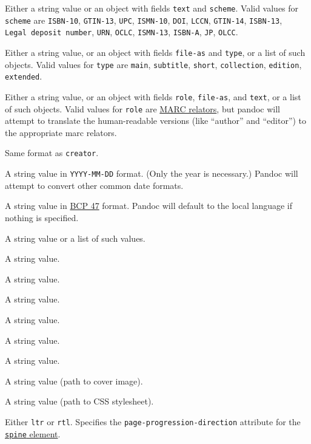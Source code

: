 \documentclass[]{article}
\providecommand{\tightlist}{%
  \setlength{\itemsep}{0pt}\setlength{\parskip}{0pt}}
\begin{document}
\begin{description}
\tightlist
\item[\texttt{identifier}]
Either a string value or an object with fields \texttt{text} and
\texttt{scheme}. Valid values for \texttt{scheme} are \texttt{ISBN-10},
\texttt{GTIN-13}, \texttt{UPC}, \texttt{ISMN-10}, \texttt{DOI},
\texttt{LCCN}, \texttt{GTIN-14}, \texttt{ISBN-13},
\texttt{Legal\ deposit\ number}, \texttt{URN}, \texttt{OCLC},
\texttt{ISMN-13}, \texttt{ISBN-A}, \texttt{JP}, \texttt{OLCC}.
\item[\texttt{title}]
Either a string value, or an object with fields \texttt{file-as} and
\texttt{type}, or a list of such objects. Valid values for \texttt{type}
are \texttt{main}, \texttt{subtitle}, \texttt{short},
\texttt{collection}, \texttt{edition}, \texttt{extended}.
\item[\texttt{creator}]
Either a string value, or an object with fields \texttt{role},
\texttt{file-as}, and \texttt{text}, or a list of such objects. Valid
values for \texttt{role} are
\href{http://loc.gov/marc/relators/relaterm.html}{MARC relators}, but
pandoc will attempt to translate the human-readable versions (like
``author'' and ``editor'') to the appropriate marc relators.
\item[\texttt{contributor}]
Same format as \texttt{creator}.
\item[\texttt{date}]
A string value in \texttt{YYYY-MM-DD} format. (Only the year is
necessary.) Pandoc will attempt to convert other common date formats.
\item[\texttt{lang} (or legacy: \texttt{language})]
A string value in \href{https://tools.ietf.org/html/bcp47}{BCP 47}
format. Pandoc will default to the local language if nothing is
specified.
\item[\texttt{subject}]
A string value or a list of such values.
\item[\texttt{description}]
A string value.
\item[\texttt{type}]
A string value.
\item[\texttt{format}]
A string value.
\item[\texttt{relation}]
A string value.
\item[\texttt{coverage}]
A string value.
\item[\texttt{rights}]
A string value.
\item[\texttt{cover-image}]
A string value (path to cover image).
\item[\texttt{stylesheet}]
A string value (path to CSS stylesheet).
\item[\texttt{page-progression-direction}]
Either \texttt{ltr} or \texttt{rtl}. Specifies the
\texttt{page-progression-direction} attribute for the
\href{http://idpf.org/epub/301/spec/epub-publications.html\#sec-spine-elem}{\texttt{spine}
element}.
\end{description}
\end{document}
